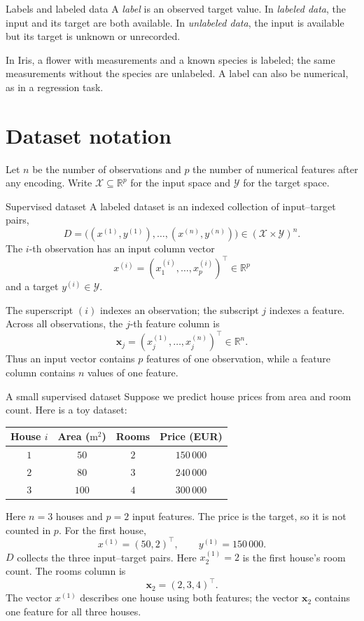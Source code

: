 \documentclass[a4paper,12pt,oneside]{report}
\begin{document}
\begin{frameddefn}{Labels and labeled data}\label{def:labels}
A \emph{label} is an observed target value. In \emph{labeled data}, the
input and its target are both available.\newline
In \emph{unlabeled data}, the
input is available but its target is unknown or unrecorded.
\end{frameddefn}

In Iris, a flower with measurements and a known species is labeled;
the same measurements without the species are unlabeled. A label can
also be numerical, as in a regression task.

\clearpage
\section{Dataset notation}

Let $n$ be the number of observations and $p$ the number of numerical
features after any encoding. Write $\mathcal{X}\subseteq\mathbb{R}^{p}$
for the input space and $\mathcal{Y}$ for the target space.

\begin{frameddefn}{Supervised dataset}\label{def:dataset}
A labeled dataset is an indexed collection of input--target pairs,
\[
  D=\bigl((x^{(1)},y^{(1)}),\ldots,(x^{(n)},y^{(n)})\bigr)
    \in(\mathcal{X}\times\mathcal{Y})^{n}.
\]
The $i$-th observation has an input column vector
\[
  x^{(i)}=(x_1^{(i)},\ldots,x_p^{(i)})^\top\in\mathbb{R}^{p}
\]
and a target $y^{(i)}\in\mathcal{Y}$.
\end{frameddefn}

The superscript $(i)$ indexes an observation; the subscript $j$ indexes
a feature. Across all observations, the $j$-th feature column is
\[
  \mathbf{x}_j=(x_j^{(1)},\ldots,x_j^{(n)})^\top\in\mathbb{R}^{n}.
\]
Thus an input vector contains $p$ features of one observation, while a
feature column contains $n$ values of one feature.

\begin{framedexample}{A small supervised dataset}
Suppose we predict house prices from area and room count. Here is a toy dataset:
\begin{center}
\begin{tabular}{@{}cccc@{}}
\toprule
\textbf{House $i$} & \textbf{Area ($\mathrm{m}^2$)} & \textbf{Rooms} & \textbf{Price (EUR)} \\
\midrule
$1$ & $50$  & $2$ & $150\,000$ \\
$2$ & $80$  & $3$ & $240\,000$ \\
$3$ & $100$ & $4$ & $300\,000$ \\
\bottomrule
\end{tabular}
\end{center}
Here $n=3$ houses and $p=2$ input features. The price is the target,
so it is not counted in $p$. For the first house,
\[
  x^{(1)}=(50,2)^\top,
  \qquad y^{(1)}=150\,000.
\]
$D$ collects the three input--target pairs. Here $x_2^{(1)}=2$ is the
first house's room count. The rooms column is
\[
  \mathbf{x}_2=(2,3,4)^\top.
\]
The vector $x^{(1)}$ describes one house using both features; the vector
$\mathbf{x}_2$ contains one feature for all three houses.
\end{framedexample}
\end{document}
